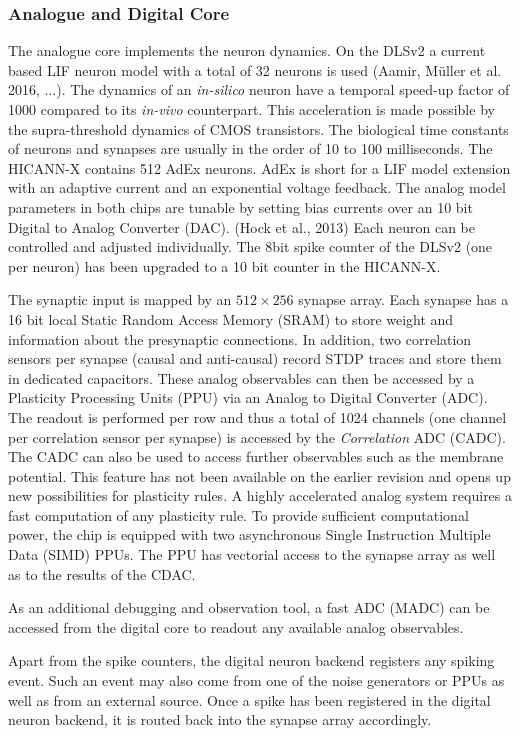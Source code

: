\subsubsection*{Analogue and Digital Core}
The analogue core implements the neuron dynamics. On the DLSv2 a current based LIF neuron model with a total of 32 neurons is used (Aamir, Müller et al. 2016, ...). The dynamics of an \textit{in-silico} neuron have a temporal speed-up factor of 1000 compared to its \textit{in-vivo} counterpart. This acceleration is made possible by the supra-threshold dynamics of CMOS transistors. The biological time constants of neurons and synapses are usually in the order of 10 to 100 milliseconds. The HICANN-X contains 512 AdEx neurons. AdEx is short for a LIF model extension with an adaptive current and an exponential voltage feedback. The analog model parameters in both chips are tunable by setting bias currents over an 10 bit Digital to Analog Converter (DAC). (Hock et al., 2013) Each neuron can be controlled and adjusted individually. The 8bit spike counter of the DLSv2 (one per neuron) has been upgraded to a 10 bit counter in the HICANN-X. 

The synaptic input is mapped by an $512 \times 256$ synapse array. Each synapse has a 16 bit local Static Random Access Memory (SRAM) to store weight and information about the presynaptic connections. In addition, two correlation sensors per synapse (causal and anti-causal) record STDP traces and store them in dedicated capacitors. These analog observables can then be accessed by a Plasticity Processing Units (PPU) via an Analog to Digital Converter (ADC). The readout is performed per row and thus a total of 1024 channels (one channel per correlation sensor per synapse) is accessed by the \textit{Correlation} ADC (CADC). The CADC can also be used to access further observables such as the membrane potential. This feature has not been available on the earlier revision and opens up new possibilities for plasticity rules. A highly accelerated analog system requires a fast computation of any plasticity rule. To provide sufficient computational power, the chip is equipped with two asynchronous Single Instruction Multiple Data (SIMD) PPUs. The PPU has vectorial access to the synapse array as well as to the results of the CDAC.   

As an additional debugging and observation tool, a fast ADC (MADC) can be accessed from the digital core to readout any available analog observables.

Apart from the spike counters, the digital neuron backend registers any spiking event. Such an event may also come from one of the noise generators or PPUs as well as from an external source. Once a spike has been registered in the digital neuron backend, it is routed back into the synapse array accordingly. 

